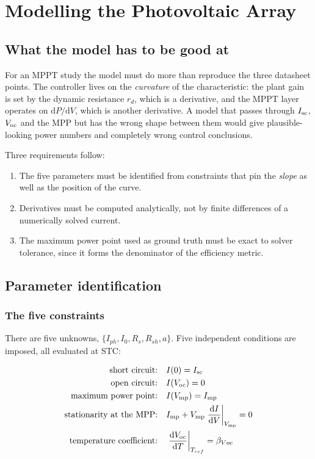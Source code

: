 \chapter{Modelling the Photovoltaic Array}
\label{ch:pvmodel}

\section{What the model has to be good at}

For an MPPT study the model must do more than reproduce the three datasheet
points. The controller lives on the \emph{curvature} of the characteristic: the
plant gain is set by the dynamic resistance $r_d$, which is a derivative, and
the MPPT layer operates on $\mathrm{d}P/\mathrm{d}V$, which is another
derivative. A model that passes through $I_{\mathrm{sc}}$, $V_{\mathrm{oc}}$ and the MPP but has the
wrong shape between them would give plausible-looking power numbers and
completely wrong control conclusions.

Three requirements follow:

\begin{enumerate}[leftmargin=1.6em]
  \item The five parameters must be identified from constraints that pin the
        \emph{slope} as well as the position of the curve.
  \item Derivatives must be computed analytically, not by finite differences of
        a numerically solved current.
  \item The maximum power point used as ground truth must be exact to solver
        tolerance, since it forms the denominator of the efficiency metric.
\end{enumerate}

\section{Parameter identification}

\subsection{The five constraints}

There are five unknowns, $\{I_{ph}, I_0, R_s, R_{sh}, a\}$. Five independent
conditions are imposed, all evaluated at STC:

\begin{align}
\text{short circuit:} \quad & I(0) = I_{\mathrm{sc}} \label{eq:c1}\\
\text{open circuit:} \quad & I(V_{\mathrm{oc}}) = 0 \label{eq:c2}\\
\text{maximum power point:} \quad & I(V_{\mathrm{mp}}) = I_{\mathrm{mp}} \label{eq:c3}\\
\text{stationarity at the MPP:} \quad & I_{\mathrm{mp}} + V_{\mathrm{mp}} \left.\frac{\mathrm{d}I}{\mathrm{d}V}\right|_{V_{\mathrm{mp}}} = 0 \label{eq:c4}\\
\text{temperature coefficient:} \quad & \left.\frac{\mathrm{d}V_{\mathrm{oc}}}{\mathrm{d}T}\right|_{T_{ref}} = \beta_{Voc} \label{eq:c5}
\end{align}

